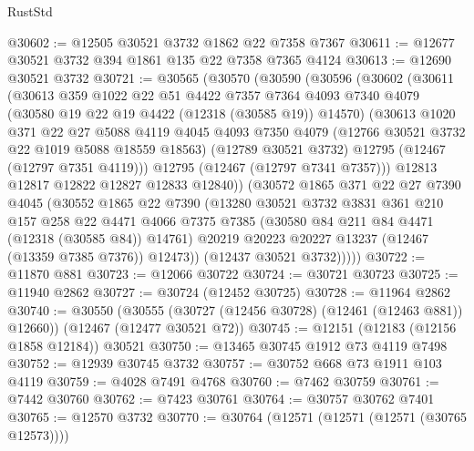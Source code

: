 \begin{lexlean}{RustStd}
\begin{coremodule}
@30602 := @12505 @30521 @3732 @1862 @22 @7358 @7367
@30611 := @12677 @30521 @3732 @394 @1861 @135 @22 @7358 @7365 @4124
@30613 := @12690 @30521 @3732
@30721 := @30565
    (@30570
      (@30590
        (@30596
          (@30602
            (@30611
              (@30613
                @359
                @1022
                @22
                @51
                @4422
                @7357
                @7364
                @4093
                @7340
                @4079
                (@30580 @19 @22 @19 @4422 (@12318 (@30585 @19)) @14570)
                (@30613
                  @1020
                  @371
                  @22
                  @27
                  @5088
                  @4119
                  @4045
                  @4093
                  @7350
                  @4079
                  (@12766 @30521 @3732 @22 @1019 @5088 @18559 @18563)
                  (@12789 @30521 @3732)
                  @12795
                  (@12467 (@12797 @7351 @4119)))
                @12795
                (@12467 (@12797 @7341 @7357)))
              @12813
              @12817
              @12822
              @12827
              @12833
              @12840))
          (@30572
            @1865
            @371
            @22
            @27
            @7390
            @4045
            (@30552
              @1865
              @22
              @7390
              (@13280
                @30521
                @3732
                @3831
                @361
                @210
                @157
                @258
                @22
                @4471
                @4066
                @7375
                @7385
                (@30580 @84 @211 @84 @4471 (@12318 (@30585 @84)) @14761)
                @20219
                @20223
                @20227
                @13237
                (@12467 (@13359 @7385 @7376))
                @12473))
            (@12437 @30521 @3732)))))
@30722 := @11870 @881
@30723 := @12066 @30722
@30724 := @30721 @30723
@30725 := @11940 @2862
@30727 := @30724 (@12452 @30725)
@30728 := @11964 @2862
@30740 := @30550
    (@30555 (@30727 (@12456 @30728) (@12461 (@12463 @881)) @12660))
    (@12467 (@12477 @30521 @72))
@30745 := @12151 (@12183 (@12156 @1858 @12184)) @30521
@30750 := @13465 @30745 @1912 @73 @4119 @7498
@30752 := @12939 @30745 @3732
@30757 := @30752 @668 @73 @1911 @103 @4119
@30759 := @4028 @7491 @4768
@30760 := @7462 @30759
@30761 := @7442 @30760
@30762 := @7423 @30761
@30764 := @30757 @30762 @7401
@30765 := @12570 @3732
@30770 := @30764 (@12571 (@12571 (@12571 (@30765 @12573))))

\end{coremodule}
\end{lexlean}

